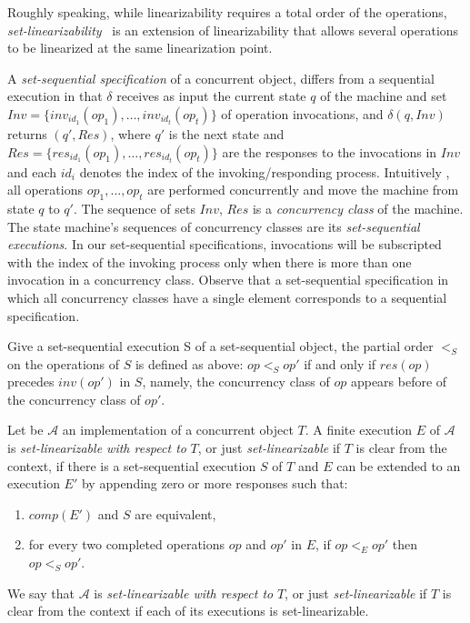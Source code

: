 Roughly speaking, while linearizability requires a total order of the operations, \emph{set-linearizability}~\cite{DBLP_journals_jacm_CastanedaRR18, DBLP_conf_podc_Neiger94} is an extension of linearizability that allows several operations to be linearized at the same linearization point.

A \emph{set-sequential specification} of a concurrent object, differs from a sequential execution in that \(\delta\) receives as input the current state \(q\) of the machine and set \(Inv = \{inv_{id_1}(op_1), \ldots, inv_{id_t}(op_t)\}\) of operation invocations, and \(\delta(q, Inv)\) returns \((q', Res)\), where \(q'\) is the next state and \(Res = \{res_{id_1}(op_1), \ldots, res_{id_t}(op_t)\}\) are the responses to the invocations in \(Inv\) and each \(id_i\) denotes the index of the invoking/responding process. Intuitively , all operations \(op_1, \ldots, op_t\) are performed concurrently and move the machine from state \(q\) to \(q'\). The sequence of sets \(Inv\), \(Res\) is a \emph{concurrency class} of the machine. The state machine's sequences of concurrency classes are its \emph{set-sequential executions}. In our set-sequential specifications, invocations will be subscripted with the index of the invoking process only when there is more than one invocation in a concurrency class. Observe that a set-sequential specification in which all concurrency classes have a single element corresponds to a sequential specification.

Give a set-sequential execution S of a set-sequential object, the partial order \(<_S\) on the operations of \(S\) is defined as above: \(op <_S op'\) if and only if \(res(op)\) precedes \(inv(op')\) in \(S\), namely, the concurrency class of \(op\) appears before of the concurrency class of \(op'\).


\begin{definition}
    Let be \(\mathcal{A}\) an implementation of a concurrent object \(T\). A finite execution \(E\) of \(\mathcal{A}\) is \emph{set-linearizable with respect to} \(T\), or just \emph{set-linearizable} if \(T\) is clear from the context, if there is a set-sequential execution \(S\) of \(T\) and \(E\) can be extended to an execution \(E'\) by appending zero or more responses such that:

    \begin{enumerate}
        \item \(comp(E')\) and \(S\) are equivalent,
        \item for every two completed operations \(op\) and \(op'\) in \(E\), if \(op <_E op'\) then \(op <_S op'\).
    \end{enumerate}

    We say that \(\mathcal{A}\) is \emph{set-linearizable with respect to} \(T\), or just \emph{set-linearizable} if \(T\) is clear from the context if each of its executions is set-linearizable.
\end{definition}

